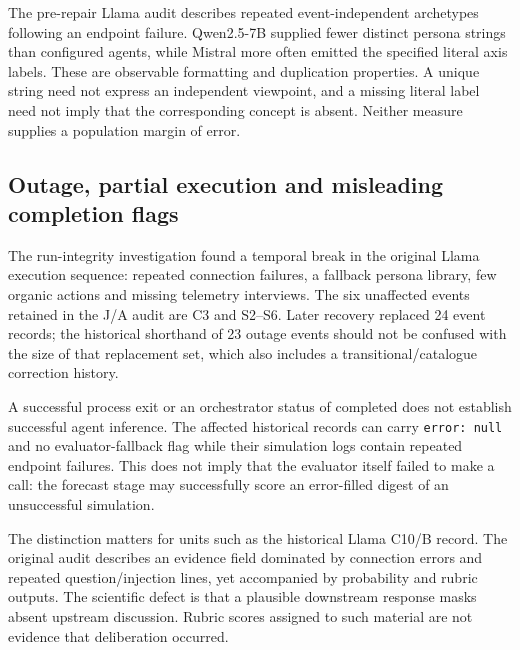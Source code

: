 The pre-repair Llama audit describes repeated event-independent archetypes following an endpoint failure. Qwen2.5-7B supplied fewer distinct persona strings than configured agents, while Mistral more often emitted the specified literal axis labels. These are observable formatting and duplication properties. A unique string need not express an independent viewpoint, and a missing literal label need not imply that the corresponding concept is absent. Neither measure supplies a population margin of error.

\subsection{Outage, partial execution and misleading completion flags}
\label{sec:outage}
The run-integrity investigation found a temporal break in the original Llama execution sequence: repeated connection failures, a fallback persona library, few organic actions and missing telemetry interviews. The six unaffected events retained in the J/A audit are C3 and S2--S6. Later recovery replaced 24 event records; the historical shorthand of 23 outage events should not be confused with the size of that replacement set, which also includes a transitional/catalogue correction history.

A successful process exit or an orchestrator status of completed does not establish successful agent inference. The affected historical records can carry \texttt{error: null} and no evaluator-fallback flag while their simulation logs contain repeated endpoint failures. This does not imply that the evaluator itself failed to make a call: the forecast stage may successfully score an error-filled digest of an unsuccessful simulation.

The distinction matters for units such as the historical Llama C10/B record. The original audit describes an evidence field dominated by connection errors and repeated question/injection lines, yet accompanied by probability and rubric outputs. The scientific defect is that a plausible downstream response masks absent upstream discussion. Rubric scores assigned to such material are not evidence that deliberation occurred.

